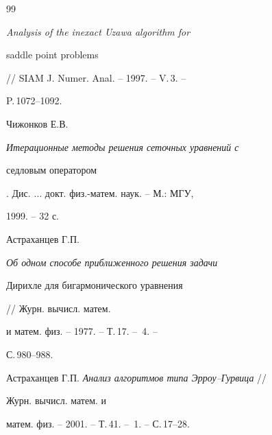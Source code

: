 \begin{thebibliography}{99}
{\em Analysis of the inexact Uzawa algorithm for 


saddle point problems} // SIAM J. Numer. Anal. -- 1997. -- V.\,3. -- 


P.\,1072--1092. 




Чижонков Е.В. {\em Итерационные методы решения сеточных уравнений с 


седловым оператором}. Дис. $\dotsc$ докт. физ.-матем. наук. -- М.: МГУ, 


1999. -- 32 с. 




Астраханцев Г.П. {\em Об одном способе приближенного решения задачи 


Дирихле для бигармонического уравнения} // Журн. вычисл. матем. 


и матем. физ. -- 1977. -- Т.\,17. -- \No\,4. -- 


С.\,980--988. 




Астраханцев Г.П. {\em Анализ алгоритмов типа Эрроу--Гурвица} // 


Журн. вычисл. матем. и 


матем. физ. -- 2001. -- Т.\,41. -- \No\,1. -- С.\,17--28.


 


\end{thebibliography} 


 


\vskip 2cm 


 








 


\label{end} 


 


